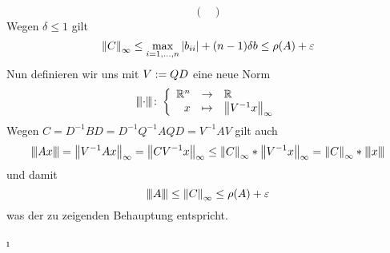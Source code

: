 \begin{exercisePage}
\begin{equation*}
\begin{pmatrix}
		\end{pmatrix}
	\end{equation*}
	Wegen $\delta \leq 1$ gilt
	\begin{equation*}
		\norm{C}_\infty \leq \max_{i=1, \dots , n} \abs{b_{ii}} + (n-1)\delta b \leq \rho(A) + \epsilon
	\end{equation*}
	Nun definieren wir uns mit $V \defeq QD$ eine neue Norm
	\begin{equation*}
		\bigabb{\NNorm{\cdot}}{\R^n}{\R}%
		{x}{\norm{V^{-1} x}_\infty}
	\end{equation*}
	Wegen $C = D^{-1} B D = D^{-1} Q^{-1} A Q D = V^{-1} A V$ gilt auch
	\begin{equation*}
		\NNorm{Ax} = \norm{V^{-1}Ax}_\infty = \norm{CV^{-1}x}_\infty \leq \norm{C}_\infty * \norm{V^{-1}x}_\infty = \norm{C}_\infty * \NNorm{x}
	\end{equation*}
	und damit
	\begin{equation*}
		\NNorm{A} \leq \norm{C}_\infty \leq \rho(A) + \epsilon
	\end{equation*}
	was der zu zeigenden Behauptung entspricht.
\end{exercisePage}

\undef\cnorm
\undef\i
\undef\NNorm